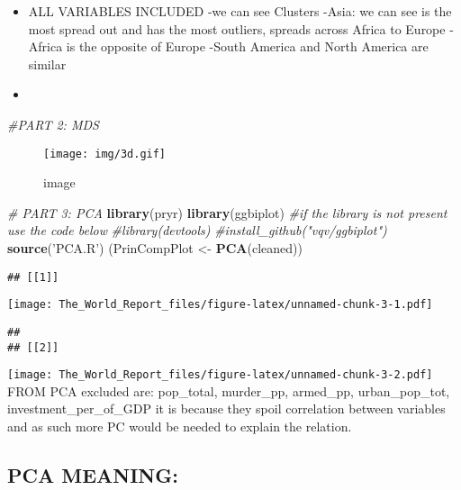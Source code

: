 \documentclass[]{article}
\newenvironment{Shaded}{\begin{snugshade}}{\end{snugshade}}
\newcommand{\KeywordTok}[1]{\textcolor[rgb]{0.13,0.29,0.53}{\textbf{#1}}}
\newcommand{\StringTok}[1]{\textcolor[rgb]{0.31,0.60,0.02}{#1}}
\newcommand{\CommentTok}[1]{\textcolor[rgb]{0.56,0.35,0.01}{\textit{#1}}}
\newcommand{\NormalTok}[1]{#1}
\begin{document}
\begin{itemize}
\item
  ALL VARIABLES INCLUDED -we can see Clusters -Asia: we can see is the
  most spread out and has the most outliers, spreads across Africa to
  Europe -Africa is the opposite of Europe -South America and North
  America are similar
\item
\end{itemize}

\begin{Shaded}
\begin{Highlighting}[]
\CommentTok{#PART 2: MDS}
\end{Highlighting}
\end{Shaded}

\begin{figure}
\centering
\texttt{[image: img/3d.gif]}
\caption{image}
\end{figure}

\begin{Shaded}
\begin{Highlighting}[]
\CommentTok{# PART 3: PCA}
\KeywordTok{library}\NormalTok{(pryr)}
\KeywordTok{library}\NormalTok{(ggbiplot) }\CommentTok{#if the library is not present use the code below}
\CommentTok{#library(devtools)}
\CommentTok{#install_github("vqv/ggbiplot")}
\KeywordTok{source}\NormalTok{(}\StringTok{'PCA.R'}\NormalTok{)}
\NormalTok{(PrinCompPlot <-}\StringTok{ }\KeywordTok{PCA}\NormalTok{(cleaned))}
\end{Highlighting}
\end{Shaded}

\begin{verbatim}
## [[1]]
\end{verbatim}

\texttt{[image: The\_World\_Report\_files/figure-latex/unnamed-chunk-3-1.pdf]}

\begin{verbatim}
## 
## [[2]]
\end{verbatim}

\texttt{[image: The\_World\_Report\_files/figure-latex/unnamed-chunk-3-2.pdf]}
FROM PCA excluded are: pop\_total, murder\_pp, armed\_pp,
urban\_pop\_tot, investment\_per\_of\_GDP it is because they spoil
correlation between variables and as such more PC would be needed to
explain the relation.

\subsection{PCA MEANING:}\label{pca-meaning}
\end{document}
